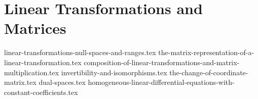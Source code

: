 \chapter{Linear Transformations and Matrices}
{linear-transformations-null-spaces-and-ranges.tex}
{the-matrix-representation-of-a-linear-transformation.tex}
{composition-of-linear-transformations-and-matrix-multiplication.tex}
{invertibility-and-isomorphisms.tex}
{the-change-of-coordinate-matrix.tex}
{dual-spaces.tex}
{homogeneous-linear-differential-equations-with-constant-coefficients.tex}
